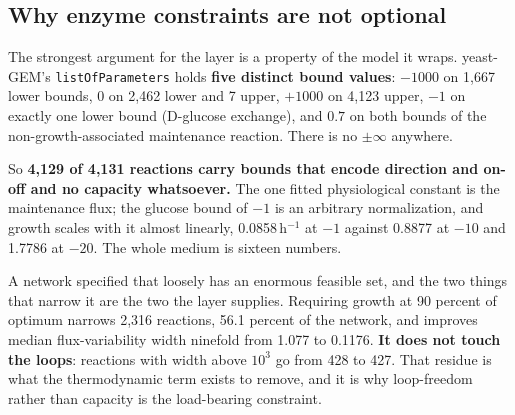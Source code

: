 \subsection{Why enzyme constraints are not optional}

The strongest argument for the layer is a property of the model it wraps. yeast-GEM's
\texttt{listOfParameters} holds \textbf{five distinct bound values}: $-1000$ on 1{,}667
lower bounds, $0$ on 2{,}462 lower and 7 upper, $+1000$ on 4{,}123 upper, $-1$ on exactly
one lower bound (D-glucose exchange), and $0.7$ on both bounds of the non-growth-associated
maintenance reaction. There is no $\pm\infty$ anywhere.

So \textbf{4{,}129 of 4{,}131 reactions carry bounds that encode direction and on-off and
no capacity whatsoever.} The one fitted physiological constant is the maintenance flux; the
glucose bound of $-1$ is an arbitrary normalization, and growth scales with it almost
linearly, 0.0858\,h$^{-1}$ at $-1$ against 0.8877 at $-10$ and 1.7786 at $-20$. The whole
medium is sixteen numbers.

A network specified that loosely has an enormous feasible set, and the two things that
narrow it are the two the layer supplies. Requiring growth at 90 percent of optimum
narrows 2{,}316 reactions, 56.1 percent of the network, and improves median flux-variability
width ninefold from 1.077 to 0.1176. \textbf{It does not touch the loops}: reactions with
width above $10^3$ go from 428 to 427. That residue is what the thermodynamic term exists
to remove, and it is why loop-freedom rather than capacity is the load-bearing constraint.
